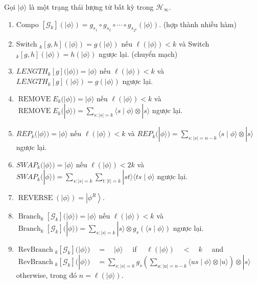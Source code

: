 \documentclass[10pt]{article}
\begin{document}
Gọi $|\phi\rangle$ là một trạng thái lượng tử bất kỳ trong $\mathcal{H}_{\infty}$.

\begin{enumerate}
  \item Compo $\left[\mathcal{G}_{k}\right](|\phi\rangle)=g_{s_{1}} \circ g_{s_{2}} \circ \cdots \circ g_{s_{2^{k}}}(|\phi\rangle)$. (hợp thành nhiều hàm)
  \item Switch $_{k}[g, h](|\phi\rangle)=g(|\phi\rangle)$ nếu $\ell(|\phi\rangle)<k$ và Switch ${ }_{k}[g, h](|\phi\rangle)=h(|\phi\rangle)$ ngược lại. (chuyển mạch)
  \item $L E N G T H_{k}[g](|\phi\rangle)=|\phi\rangle$ nếu $\ell(|\phi\rangle)<k$ và $L E N G T H_{k}[g](|\phi\rangle)=g(|\phi\rangle)$ ngược lại.
  \item $\operatorname{REMOVE} E_{k}(|\phi\rangle)=|\phi\rangle$ nếu $\ell(|\phi\rangle)<k$ và $\operatorname{REMOVE} E_{k}(|\phi\rangle)=\sum_{s:|s|=k}\langle s \mid \phi\rangle \otimes|s\rangle$ ngược lại.
  \item $R E P_{k}(|\phi\rangle)=|\phi\rangle$ nếu $\ell(|\phi\rangle)<k$ và $R E P_{k}(|\phi\rangle)=\sum_{s:|s|=n-k}\langle s \mid \phi\rangle \otimes|s\rangle$ ngược lại.
  \item $S W A P_{k}(|\phi\rangle)=|\phi\rangle$ nếu $\ell(|\phi\rangle)<2 k$ và $S W A P_{k}(|\phi\rangle)=\sum_{s:|s|=k} \sum_{t:|t|=k}|s t\rangle\langle t s \mid \phi\rangle$ ngược lại.
  \item $\operatorname{REVERSE}(|\phi\rangle)=\left|\phi^{R}\right\rangle$.
  \item $\operatorname{Branch}_{k}\left[\mathcal{G}_{k}\right](|\phi\rangle)=|\phi\rangle$ nếu $\ell(|\phi\rangle)<k$ và $\operatorname{Branch}_{k}\left[\mathcal{G}_{k}\right](|\phi\rangle)=\sum_{s:|s|=k}|s\rangle \otimes g_{s}(\langle s \mid \phi\rangle)$ ngược lại.
  \item $\operatorname{RevBranch}{ }_{k}\left[\mathcal{G}_{k}\right](|\phi\rangle) \quad=\quad|\phi\rangle \quad$ if $\quad \ell(|\phi\rangle) \quad<\quad k \quad$ and $\operatorname{RevBranch}{ }_{k}\left[\mathcal{G}_{k}\right](|\phi\rangle) \quad= \sum_{s:|s|=k} g_{s}\left(\sum_{u:|u|=n-k}\langle u s \mid \phi\rangle \otimes|u\rangle\right) \otimes|s\rangle$ otherwise, trong đó $n=\ell(|\phi\rangle)$.\\

\end{enumerate}
\end{document}
